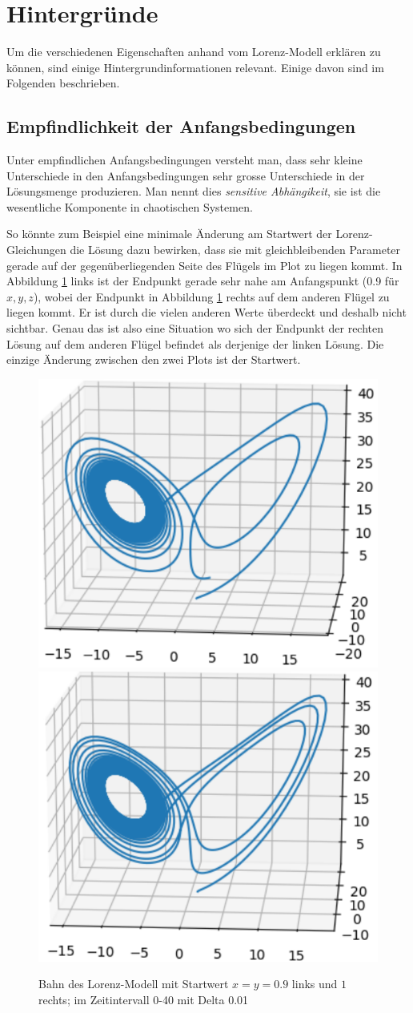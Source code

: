 
\section{Hintergründe}\label{backgroundinfo}
Um die verschiedenen Eigenschaften anhand vom Lorenz-Modell erklären zu können, sind einige Hintergrundinformationen relevant. Einige davon sind im Folgenden beschrieben.

\subsection{Empfindlichkeit der Anfangsbedingungen}
Unter empfindlichen Anfangsbedingungen versteht man, dass sehr kleine Unterschiede in den Anfangsbedingungen sehr grosse Unterschiede in der Lösungsmenge produzieren. Man nennt dies {\em sensitive Abhängikeit}, sie ist die wesentliche Komponente in chaotischen Systemen. 
%

So könnte zum Beispiel eine minimale Änderung am Startwert der Lorenz-Gleichungen die Lösung dazu bewirken, dass sie mit gleichbleibenden Parameter gerade auf der gegenüberliegenden Seite des Flügels im Plot zu liegen kommt. In Abbildung \ref{fig:lorenz-startwerte} links ist der Endpunkt gerade sehr nahe am Anfangspunkt (0.9 für $ x, y, z $), wobei der Endpunkt in Abbildung \ref{fig:lorenz-startwerte} rechts auf dem anderen Flügel zu liegen kommt. Er ist durch die vielen anderen Werte überdeckt und deshalb nicht sichtbar. Genau das ist also eine Situation wo sich der Endpunkt der rechten Lösung auf dem anderen Flügel befindet als derjenige der linken Lösung. Die einzige Änderung zwischen den zwei Plots ist der Startwert.

\begin{figure}
\centering
\includegraphics[width=0.45\linewidth]{lorenz/assets/lorenz-modell/lorenz09.pdf} 
\quad
\includegraphics[width=0.45\linewidth]{lorenz/assets/lorenz-modell/lorenz10.pdf}
\caption{Bahn des Lorenz-Modell mit Startwert $ x = y = 0.9 $ links und $ 1 $ rechts; im Zeitintervall 0-40 mit Delta 0.01}
\label{fig:lorenz-startwerte}
\end{figure}


